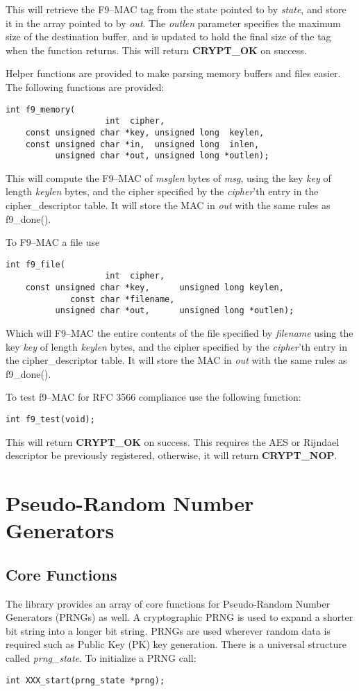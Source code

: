\documentclass[synpaper]{book}
\newcommand{\mysection}[1]    %
	{                   %
	\section{#1}
   \markboth{\textsf{www.libtom.org}}{\thesection ~ {#1}}
	}
\begin{document}
This will retrieve the F9--MAC tag from the state pointed to by \textit{state}, and store it in the array pointed to by \textit{out}.  The \textit{outlen} parameter
specifies the maximum size of the destination buffer, and is updated to hold the final size of the tag when the function returns.  This will return
\textbf{CRYPT\_OK} on success.

Helper functions are provided to make parsing memory buffers and files easier.  The following functions are provided:

\begin{verbatim}
int f9_memory(
                    int  cipher,
    const unsigned char *key, unsigned long  keylen,
    const unsigned char *in,  unsigned long  inlen,
          unsigned char *out, unsigned long *outlen);
\end{verbatim}
This will compute the F9--MAC of \textit{msglen} bytes of \textit{msg}, using the key \textit{key} of length \textit{keylen} bytes, and the cipher
specified by the \textit{cipher}'th entry in the cipher\_descriptor table.  It will store the MAC in \textit{out} with the same rules as f9\_done().

To F9--MAC a file use
\begin{verbatim}
int f9_file(
                    int  cipher,
    const unsigned char *key,      unsigned long keylen,
             const char *filename,
          unsigned char *out,      unsigned long *outlen);
\end{verbatim}

Which will F9--MAC the entire contents of the file specified by \textit{filename} using the key \textit{key} of length \textit{keylen} bytes, and the cipher
specified by the \textit{cipher}'th entry in the cipher\_descriptor table.  It will store the MAC in \textit{out} with the same rules as f9\_done().


To test f9--MAC for RFC 3566 compliance use the following function:

\begin{verbatim}
int f9_test(void);
\end{verbatim}

This will return \textbf{CRYPT\_OK} on success.  This requires the AES or Rijndael descriptor be previously registered, otherwise, it will return
\textbf{CRYPT\_NOP}.

\chapter{Pseudo-Random Number Generators}
\mysection{Core Functions}
The library provides an array of core functions for Pseudo-Random Number Generators (PRNGs) as well.  A cryptographic PRNG is
used to expand a shorter bit string into a longer bit string.  PRNGs are used wherever random data is required such as Public Key (PK)
key generation.  There is a universal structure called \textit{prng\_state}.  To initialize a PRNG call:
\begin{verbatim}
int XXX_start(prng_state *prng);
\end{verbatim}
\end{document}
